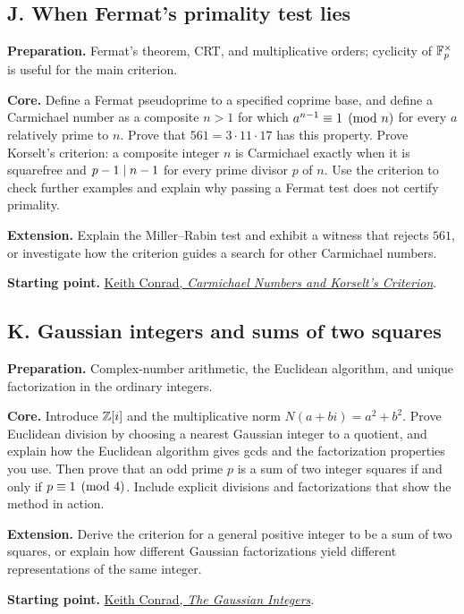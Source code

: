 \begin{capstoneproject}
\subsection*{J. When Fermat's primality test lies}
\textbf{Preparation.} Fermat's theorem, CRT, and multiplicative orders;
cyclicity of $\mathbb F_p^\times$ is useful for the main criterion.

\textbf{Core.} Define a Fermat pseudoprime to a specified coprime base,
and define a Carmichael number as a composite $n>1$ for which
$a^{n-1}\equiv1\pmod n$ for every $a$ relatively prime to $n$.
Prove that $561=3\cdot11\cdot17$ has this property. Prove Korselt's
criterion: a composite integer $n$ is Carmichael exactly when it is
squarefree and $p-1\mid n-1$ for every prime divisor $p$ of $n$.
Use the criterion to check further examples and explain why passing a
Fermat test does not certify primality.

\textbf{Extension.} Explain the Miller--Rabin test and exhibit a witness
that rejects $561$, or investigate how the criterion guides a search
for other Carmichael numbers.

\textbf{Starting point.}
\href{https://kconrad.math.uconn.edu/blurbs/ugradnumthy/carmichaelkorselt.pdf}{Keith Conrad, \emph{Carmichael Numbers and Korselt's Criterion}}.

\end{capstoneproject}

\begin{capstoneproject}
\subsection*{K. Gaussian integers and sums of two squares}
\textbf{Preparation.} Complex-number arithmetic, the Euclidean algorithm,
and unique factorization in the ordinary integers.

\textbf{Core.} Introduce $\mathbb Z[i]$ and the multiplicative norm
$N(a+bi)=a^2+b^2$. Prove Euclidean division by choosing a nearest
Gaussian integer to a quotient, and explain how the Euclidean algorithm
gives gcds and the factorization properties you use. Then prove that an
odd prime $p$ is a sum of two integer squares if and only if
$p\equiv1\pmod4$. Include explicit divisions and factorizations that
show the method in action.

\textbf{Extension.} Derive the criterion for a general positive integer
to be a sum of two squares, or explain how different Gaussian
factorizations yield different representations of the same integer.

\textbf{Starting point.}
\href{https://kconrad.math.uconn.edu/blurbs/ugradnumthy/Zinotes.pdf}{Keith Conrad, \emph{The Gaussian Integers}}.

\end{capstoneproject}

